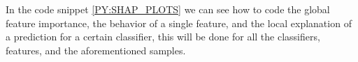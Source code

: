 In the code snippet \ref{PY:SHAP_PLOTS} we can see how to code the global feature importance, the behavior of a single feature, and the local explanation of a prediction for a certain classifier, this will be done for all the classifiers, features, and the aforementioned samples.



